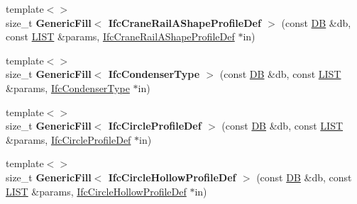 \begin{DoxyCompactItemize}
\item 
\hypertarget{namespace_assimp_1_1_s_t_e_p_ab3c0f5b3a470c9638d7090724c68ead4}{{\footnotesize template$<$$>$ }\\size\+\_\+t {\bfseries Generic\+Fill$<$ Ifc\+Crane\+Rail\+A\+Shape\+Profile\+Def $>$} (const \hyperlink{class_assimp_1_1_s_t_e_p_1_1_d_b}{D\+B} \&db, const \hyperlink{class_assimp_1_1_s_t_e_p_1_1_e_x_p_r_e_s_s_1_1_l_i_s_t}{L\+I\+S\+T} \&params, \hyperlink{struct_assimp_1_1_i_f_c_1_1_ifc_crane_rail_a_shape_profile_def}{Ifc\+Crane\+Rail\+A\+Shape\+Profile\+Def} $\ast$in)}\label{namespace_assimp_1_1_s_t_e_p_ab3c0f5b3a470c9638d7090724c68ead4}

\item 
\hypertarget{namespace_assimp_1_1_s_t_e_p_ac550b23d032652d3fb423b2ff401dbbf}{{\footnotesize template$<$$>$ }\\size\+\_\+t {\bfseries Generic\+Fill$<$ Ifc\+Condenser\+Type $>$} (const \hyperlink{class_assimp_1_1_s_t_e_p_1_1_d_b}{D\+B} \&db, const \hyperlink{class_assimp_1_1_s_t_e_p_1_1_e_x_p_r_e_s_s_1_1_l_i_s_t}{L\+I\+S\+T} \&params, \hyperlink{struct_assimp_1_1_i_f_c_1_1_ifc_condenser_type}{Ifc\+Condenser\+Type} $\ast$in)}\label{namespace_assimp_1_1_s_t_e_p_ac550b23d032652d3fb423b2ff401dbbf}

\item 
\hypertarget{namespace_assimp_1_1_s_t_e_p_a741e9a576962da841e18f8580059142b}{{\footnotesize template$<$$>$ }\\size\+\_\+t {\bfseries Generic\+Fill$<$ Ifc\+Circle\+Profile\+Def $>$} (const \hyperlink{class_assimp_1_1_s_t_e_p_1_1_d_b}{D\+B} \&db, const \hyperlink{class_assimp_1_1_s_t_e_p_1_1_e_x_p_r_e_s_s_1_1_l_i_s_t}{L\+I\+S\+T} \&params, \hyperlink{struct_assimp_1_1_i_f_c_1_1_ifc_circle_profile_def}{Ifc\+Circle\+Profile\+Def} $\ast$in)}\label{namespace_assimp_1_1_s_t_e_p_a741e9a576962da841e18f8580059142b}

\item 
\hypertarget{namespace_assimp_1_1_s_t_e_p_aad6e8cb1bc4598006fc7e9c78a06a2a2}{{\footnotesize template$<$$>$ }\\size\+\_\+t {\bfseries Generic\+Fill$<$ Ifc\+Circle\+Hollow\+Profile\+Def $>$} (const \hyperlink{class_assimp_1_1_s_t_e_p_1_1_d_b}{D\+B} \&db, const \hyperlink{class_assimp_1_1_s_t_e_p_1_1_e_x_p_r_e_s_s_1_1_l_i_s_t}{L\+I\+S\+T} \&params, \hyperlink{struct_assimp_1_1_i_f_c_1_1_ifc_circle_hollow_profile_def}{Ifc\+Circle\+Hollow\+Profile\+Def} $\ast$in)}\label{namespace_assimp_1_1_s_t_e_p_aad6e8cb1bc4598006fc7e9c78a06a2a2}


\end{DoxyCompactItemize}
